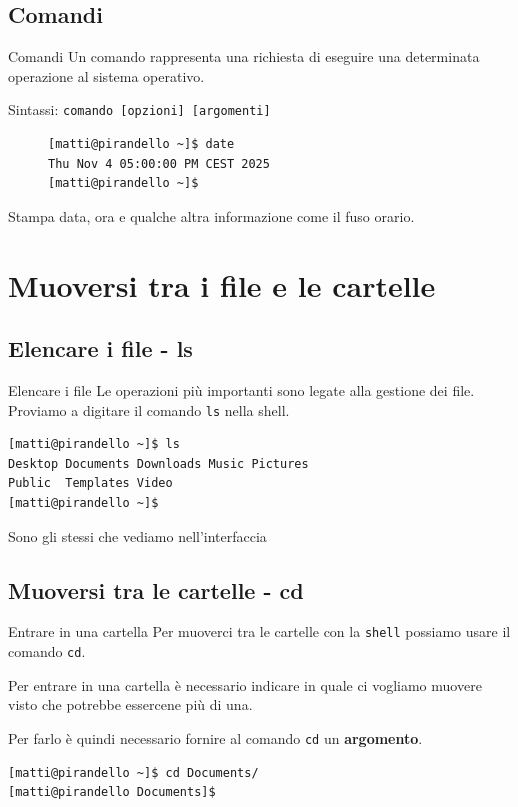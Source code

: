 \documentclass{beamer}
\begin{document}
\subsection{Comandi}
\begin{frame}[fragile]{Comandi}
  Un comando rappresenta una richiesta di eseguire una determinata operazione al
  sistema operativo.\bigskip

  Sintassi: \texttt{comando [opzioni] [argomenti]}

  \begin{figure}
        \begin{lstlisting}
[matti@pirandello ~]$ date
Thu Nov 4 05:00:00 PM CEST 2025
[matti@pirandello ~]$
    \end{lstlisting}
  \end{figure}
  \begin{flushright}
    \footnotesize
      Stampa data, ora e qualche altra informazione come il fuso orario.
  \end{flushright}
\end{frame}

\section{Muoversi tra i file e le cartelle}

\subsection{Elencare i file - ls}
\begin{frame}[fragile]{Elencare i file}
  Le operazioni più importanti sono legate alla gestione dei file. Proviamo a 
  digitare il comando \texttt{ls} nella shell.\bigskip

    \begin{lstlisting}
[matti@pirandello ~]$ ls
Desktop Documents Downloads Music Pictures 
Public  Templates Video
[matti@pirandello ~]$
    \end{lstlisting}

  Sono gli stessi che vediamo nell'interfaccia
\end{frame}

\subsection{Muoversi tra le cartelle - cd}
\begin{frame}[fragile]{Entrare in una cartella}
  Per muoverci tra le cartelle con la \texttt{shell}
  possiamo usare il comando \texttt{cd}.\bigskip

  Per entrare in una cartella è necessario indicare in quale ci vogliamo muovere 
  visto che potrebbe essercene più di una.\bigskip

  Per farlo è quindi necessario fornire al comando \texttt{cd} un 
  \textbf{argomento}.\bigskip

    \begin{lstlisting}
[matti@pirandello ~]$ cd Documents/
[matti@pirandello Documents]$
    \end{lstlisting}
\end{frame}
\end{document}
